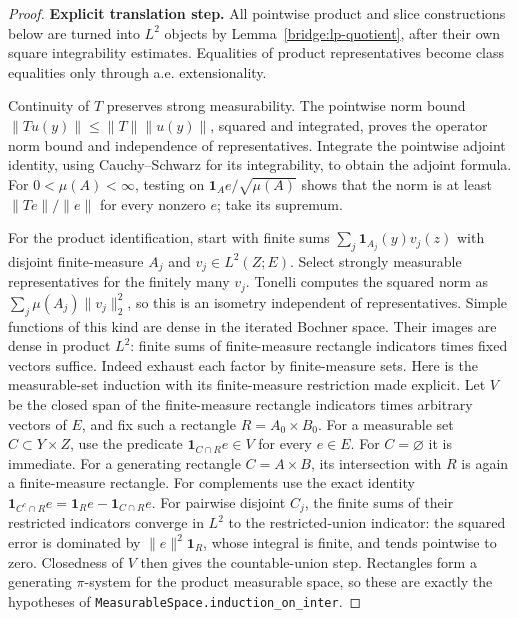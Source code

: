 \documentclass[11pt,a4paper]{article}
\theoremstyle{definition}
\theoremstyle{remark}
\begin{document}
\begin{proof}
\noindent\textbf{Explicit translation step.} All pointwise product and slice constructions below are turned into
$L^2$ objects by Lemma~\ref{bridge:lp-quotient}, after their own square
integrability estimates. Equalities of product representatives become
class equalities only through a.e. extensionality.

Continuity of $T$ preserves strong measurability. The pointwise norm
bound $\|Tu(y)\|\leq\|T\|\|u(y)\|$, squared and integrated,
proves the operator norm bound and
independence of representatives. Integrate the pointwise adjoint
identity, using Cauchy--Schwarz for its integrability, to obtain the
adjoint formula. For $0<\mu(A)<\infty$, testing on
$\mathbf1_A e/\sqrt{\mu(A)}$ shows that the norm is at least
$\|Te\|/\|e\|$ for every nonzero $e$; take its supremum.

For the product identification, start with finite sums
$\sum_j\mathbf1_{A_j}(y)v_j(z)$ with disjoint finite-measure $A_j$
and $v_j\in L^2(Z;E)$. Select strongly measurable representatives
for the finitely many $v_j$. Tonelli computes the squared norm as
$\sum_j\mu(A_j)\|v_j\|_2^2$, so this is an isometry independent
of representatives. Simple functions of this kind are dense in the
iterated Bochner space. Their images are dense in product $L^2$:
finite sums of finite-measure rectangle indicators times fixed
vectors suffice. Indeed exhaust each factor by finite-measure sets.
Here is the measurable-set induction with its finite-measure
restriction made explicit. Let $V$ be the closed span of the
finite-measure rectangle indicators times arbitrary vectors of $E$,
and fix such a rectangle $R=A_0\times B_0$. For a measurable set
$C\subset Y\times Z$, use the predicate
$\mathbf1_{C\cap R}e\in V$ for every $e\in E$.
For $C=\varnothing$ it is immediate. For a generating rectangle
$C=A\times B$, its intersection with $R$ is again a finite-measure
rectangle. For complements use the exact identity
$\mathbf1_{C^c\cap R}e=\mathbf1_Re-\mathbf1_{C\cap R}e$.
For pairwise disjoint $C_j$, the finite sums of their restricted
indicators converge in $L^2$ to the restricted-union indicator:
the squared error is dominated by $\|e\|^2\mathbf1_R$, whose
integral is finite, and tends pointwise to zero. Closedness of $V$
then gives the countable-union step. Rectangles form a generating
$\pi$-system for the product measurable space, so these are exactly
the hypotheses of
\nolinkurl{MeasurableSpace.induction_on_inter}.


\end{proof}
\end{document}
